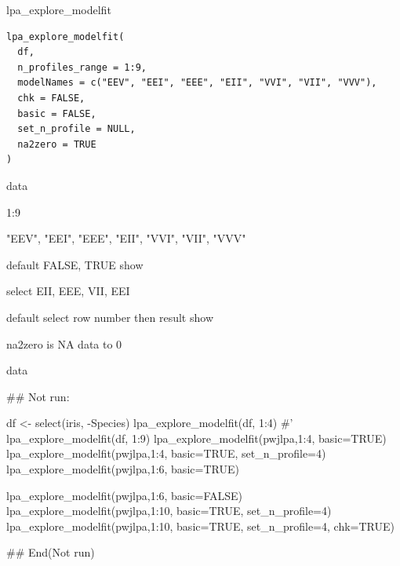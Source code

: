 \documentclass[a4paper]{book}
\begin{document}
%
\begin{Description}
lpa\_explore\_modelfit
\end{Description}
%
\begin{Usage}
\begin{verbatim}
lpa_explore_modelfit(
  df,
  n_profiles_range = 1:9,
  modelNames = c("EEV", "EEI", "EEE", "EII", "VVI", "VII", "VVV"),
  chk = FALSE,
  basic = FALSE,
  set_n_profile = NULL,
  na2zero = TRUE
)
\end{verbatim}
\end{Usage}
%
\begin{Arguments}
\begin{ldescription}
\item[\code{df}] data

\item[\code{n\_profiles\_range}] 1:9

\item[\code{modelNames}] "EEV", "EEI", "EEE", "EII", "VVI", "VII", "VVV"

\item[\code{chk}] default FALSE, TRUE show

\item[\code{basic}] select EII, EEE, VII, EEI

\item[\code{set\_n\_profile}] default select row number then result show

\item[\code{na2zero}] na2zero is NA data to 0
\end{ldescription}
\end{Arguments}
%
\begin{Value}
data
\end{Value}
%
\begin{Examples}
\begin{ExampleCode}

## Not run: 

df <- select(iris, -Species)
lpa_explore_modelfit(df, 1:4)
#' lpa_explore_modelfit(df, 1:9)
lpa_explore_modelfit(pwjlpa,1:4, basic=TRUE)
lpa_explore_modelfit(pwjlpa,1:4, basic=TRUE, set_n_profile=4)
lpa_explore_modelfit(pwjlpa,1:6, basic=TRUE)

lpa_explore_modelfit(pwjlpa,1:6, basic=FALSE)
lpa_explore_modelfit(pwjlpa,1:10, basic=TRUE, set_n_profile=4)
lpa_explore_modelfit(pwjlpa,1:10, basic=TRUE, set_n_profile=4, chk=TRUE)


## End(Not run)

\end{ExampleCode}
\end{Examples}
\end{document}
